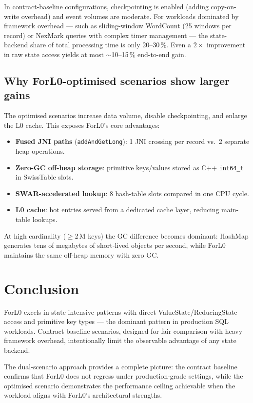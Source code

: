 \documentclass[11pt,a4paper]{article}
\begin{document}
In contract-baseline configurations, checkpointing is enabled (adding
copy-on-write overhead) and event volumes are moderate.
For workloads dominated by framework overhead --- such as sliding-window
WordCount (25 windows per record) or NexMark queries with complex timer
management --- the state-backend share of total processing time is only
20--30\,\%.  Even a $2\times$ improvement in raw state access yields at
most $\sim$10--15\,\% end-to-end gain.

\subsection{Why ForL0-optimised scenarios show larger gains}

The optimised scenarios increase data volume, disable checkpointing,
and enlarge the L0 cache.  This exposes ForL0's core advantages:
\begin{itemize}
  \item \textbf{Fused JNI paths} (\texttt{addAndGetLong}): 1 JNI crossing
        per record vs.\ 2 separate heap operations.
  \item \textbf{Zero-GC off-heap storage}: primitive keys/values stored
        as C++ \texttt{int64\_t} in SwissTable slots.
  \item \textbf{SWAR-accelerated lookup}: 8 hash-table slots compared in
        one CPU cycle.
  \item \textbf{L0 cache}: hot entries served from a dedicated cache
        layer, reducing main-table lookups.
\end{itemize}

At high cardinality ($\geq$2\,M keys) the GC difference becomes
dominant: HashMap generates tens of megabytes of short-lived objects per
second, while ForL0 maintains the same off-heap memory with zero GC.

\section{Conclusion}

ForL0 excels in state-intensive patterns with direct ValueState/ReducingState
access and primitive key types --- the dominant pattern in production SQL
workloads.  Contract-baseline scenarios, designed for fair comparison with
heavy framework overhead, intentionally limit the observable advantage of
any state backend.

The dual-scenario approach provides a complete picture:
the contract baseline confirms that ForL0 does not regress under
production-grade settings, while the optimised scenario demonstrates
the performance ceiling achievable when the workload aligns with
ForL0's architectural strengths.
\end{document}
